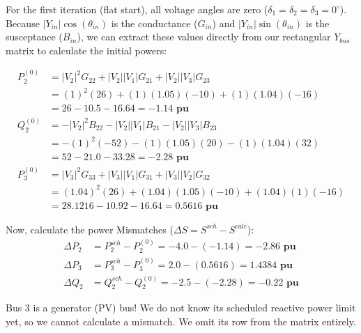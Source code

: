 \documentclass[11pt]{article}
\begin{document}
\begin{stepbox}
For the first iteration (flat start), all voltage angles are zero ($\delta_1 = \delta_2 = \delta_3 = 0^\circ$). Because $|Y_{in}|\cos(\theta_{in})$ is the conductance ($G_{in}$) and $|Y_{in}|\sin(\theta_{in})$ is the susceptance ($B_{in}$), we can extract these values directly from our rectangular $Y_{bus}$ matrix to calculate the initial powers:

\begin{align*}
    P_2^{(0)} &= |V_2|^2 G_{22} + |V_2||V_1|G_{21} + |V_2||V_3|G_{23} \\
    &= (1)^2(26) + (1)(1.05)(-10) + (1)(1.04)(-16) \\
    &= 26 - 10.5 - 16.64 = \mathbf{-1.14 \text{ pu}} \\[0.3cm]
    Q_2^{(0)} &= -|V_2|^2 B_{22} - |V_2||V_1|B_{21} - |V_2||V_3|B_{23} \\
    &= -(1)^2(-52) - (1)(1.05)(20) - (1)(1.04)(32) \\
    &= 52 - 21.0 - 33.28 = \mathbf{-2.28 \text{ pu}} \\[0.3cm]
    P_3^{(0)} &= |V_3|^2 G_{33} + |V_3||V_1|G_{31} + |V_3||V_2|G_{32} \\
    &= (1.04)^2(26) + (1.04)(1.05)(-10) + (1.04)(1)(-16) \\
    &= 28.1216 - 10.92 - 16.64 = \mathbf{0.5616 \text{ pu}}
\end{align*}

Now, calculate the power Mismatches ($\Delta S = S^{sch} - S^{calc}$):
\begin{align*}
    \Delta P_2 &= P_2^{sch} - P_2^{(0)} = -4.0 - (-1.14) = \mathbf{-2.86 \text{ pu}} \\
    \Delta P_3 &= P_3^{sch} - P_3^{(0)} = 2.0 - (0.5616) = \mathbf{1.4384 \text{ pu}} \\
    \Delta Q_2 &= Q_2^{sch} - Q_2^{(0)} = -2.5 - (-2.28) = \mathbf{-0.22 \text{ pu}}
\end{align*}
\end{stepbox}

\begin{conceptbox}
Bus 3 is a generator (PV) bus! We do not know its scheduled reactive power limit yet, so we cannot calculate a mismatch. We omit its row from the matrix entirely.
\end{conceptbox}
\end{document}
